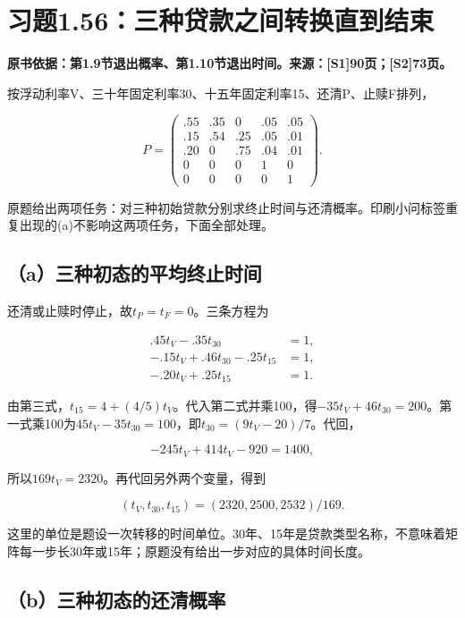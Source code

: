 \documentclass[
  11pt,
  a4paper,
  UTF8,
  fontset=fandol]{ctexart}
\begin{document}
\section{习题1.56：三种贷款之间转换直到结束}\label{ux4e60ux98981.56ux4e09ux79cdux8d37ux6b3eux4e4bux95f4ux8f6cux6362ux76f4ux5230ux7ed3ux675f}

\textbf{原书依据：第1.9节退出概率、第1.10节退出时间。来源：{[}S1{]}90页；{[}S2{]}73页。}

按浮动利率V、三十年固定利率30、十五年固定利率15、还清P、止赎F排列，

\[
P=\begin{pmatrix}
.55&.35&0&.05&.05\\
.15&.54&.25&.05&.01\\
.20&0&.75&.04&.01\\
0&0&0&1&0\\
0&0&0&0&1
\end{pmatrix}.
\]

原题给出两项任务：对三种初始贷款分别求终止时间与还清概率。印刷小问标签重复出现的(a)不影响这两项任务，下面全部处理。

\subsection{（a）三种初态的平均终止时间}\label{aux4e09ux79cdux521dux6001ux7684ux5e73ux5747ux7ec8ux6b62ux65f6ux95f4}

还清或止赎时停止，故\(t_P=t_F=0\)。三条方程为

\[
\begin{aligned}
.45t_V-.35t_{30}&=1,\\
-.15t_V+.46t_{30}-.25t_{15}&=1,\\
-.20t_V+.25t_{15}&=1.
\end{aligned}
\]

由第三式，\(t_{15}=4+(4/5)t_V\)。代入第二式并乘100，得\(-35t_V+46t_{30}=200\)。第一式乘100为\(45t_V-35t_{30}=100\)，即\(t_{30}=(9t_V-20)/7\)。代回，

\[
-245t_V+414t_V-920=1400,
\]

所以\(169t_V=2320\)。再代回另外两个变量，得到

\[
\boxed{(t_V,t_{30},t_{15})=(2320,2500,2532)/169.}
\]

这里的单位是题设一次转移的时间单位。30年、15年是贷款类型名称，不意味着矩阵每一步长30年或15年；原题没有给出一步对应的具体时间长度。

\subsection{（b）三种初态的还清概率}\label{bux4e09ux79cdux521dux6001ux7684ux8fd8ux6e05ux6982ux7387}
\end{document}
